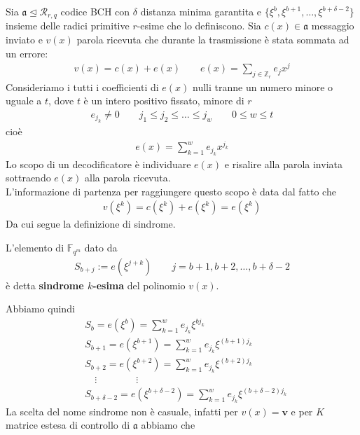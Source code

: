 Sia $\mathfrak{a} \trianglelefteq  \mathcal{R}_{r,q} $ codice BCH con $\delta$ distanza minima garantita e $\lbrace \xi^{b}, \xi^{b+1}, \dots , \xi^{b + \delta - 2} \rbrace$ insieme delle radici primitive $r$-esime che lo definiscono. Sia $c(x) \in \mathfrak{a}$ messaggio inviato e $v(x)$ parola ricevuta che durante la trasmissione è stata sommata ad un errore:
\begin{align*}
   v(x) = c(x) + e(x) \qquad e(x) = \sum_{j \in \mathbb{Z}_{r}} e_{j} x^{j}
\end{align*}
Consideriamo i tutti i coefficienti di $e(x)$ nulli tranne un numero minore o uguale a $t$, dove $t$ è un intero positivo fissato, minore di $r$
\begin{align*}
   e_{j_{k}} \neq 0 \qquad j_{1} \leq j_{2} \leq \dots \leq j_{w} \qquad 0 \leq w \leq t 
\end{align*}
cioè
\begin{align*}
   e(x) =  \sum_{k=1}^{w} e_{j_{k}} x^{j_{k}}
\end{align*}
Lo scopo di un decodificatore è individuare $e(x)$ e risalire alla parola inviata sottraendo $e(x)$ alla parola ricevuta.\\
L'informazione di partenza per raggiungere questo scopo è data dal fatto che 
\begin{align*}
   v(\xi^{k}) = c(\xi^{k}) + e(\xi^{k}) = e(\xi^{k})
\end{align*}
Da cui segue la definizione di sindrome.
\begin{definizione}
   L'elemento di $\mathbb{F}_{q^m}$ dato da 
   \begin{align*}
      S_{b+j} := e(\xi^{j+ k}) \qquad j = b+1, b+2, \dots, b + \delta - 2
   \end{align*}
   è detta {\bf sindrome $k$-esima} del polinomio $v(x)$.
\end{definizione}
Abbiamo quindi
\begin{align*}
   &S_{b} = e(\xi^{b}) = \sum_{k=1}^{w} e_{j_{k}} \xi^{b j_{k}} \\
   &S_{b+1} = e(\xi^{b+ 1}) = \sum_{k=1}^{w} e_{j_{k}} \xi^{(b+1) j_{k}} \\
   &S_{b+2} = e(\xi^{b+ 2}) = \sum_{k=1}^{w} e_{j_{k}} \xi^{(b+2) j_{k}} \\
   & \quad \vdots \qquad \qquad \vdots \\
   &S_{b + \delta - 2} = e(\xi^{ b +\delta - 2}) = \sum_{k=1}^{w} e_{j_{k}} \xi^{(b +\delta - 2) j_{k}}
\end{align*}
La scelta del nome sindrome non è casuale, infatti per $v(x) = \mathbf{v}$ e per $K$ matrice estesa di controllo di $\mathfrak{a}$ abbiamo che
